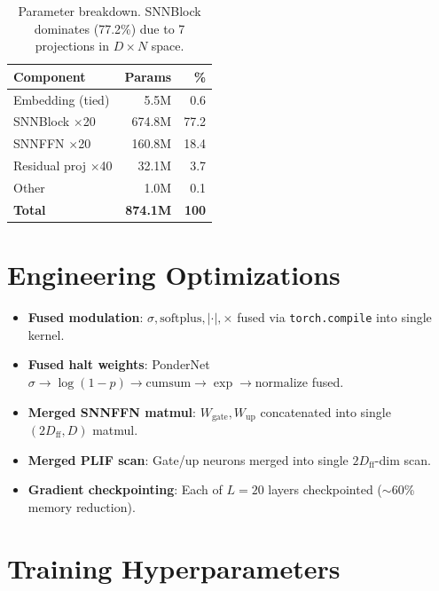 \documentclass{article}
\begin{document}
\begin{table}[H]
\centering
\small
\caption{Parameter breakdown. SNNBlock dominates (77.2\%) due to 7 projections in $D{\times}N$ space.}
\begin{tabular}{lrr}
\toprule
\textbf{Component} & \textbf{Params} & \textbf{\%} \\
\midrule
Embedding (tied) & 5.5M & 0.6 \\
SNNBlock $\times$20 & 674.8M & 77.2 \\
SNNFFN $\times$20 & 160.8M & 18.4 \\
Residual proj $\times$40 & 32.1M & 3.7 \\
Other & 1.0M & 0.1 \\
\midrule
\textbf{Total} & \textbf{874.1M} & \textbf{100} \\
\bottomrule
\end{tabular}
\end{table}

\section{Engineering Optimizations}
\label{app:engineering}

\begin{itemize}
    \item \textbf{Fused modulation}: $\sigma, \text{softplus}, |\cdot|, \times$ fused via \texttt{torch.compile} into single kernel.
    \item \textbf{Fused halt weights}: PonderNet $\sigma \to \log(1{-}p) \to \text{cumsum} \to \exp \to \text{normalize}$ fused.
    \item \textbf{Merged SNNFFN matmul}: $W_{\text{gate}}, W_{\text{up}}$ concatenated into single $(2D_{\text{ff}}, D)$ matmul.
    \item \textbf{Merged PLIF scan}: Gate/up neurons merged into single $2D_{\text{ff}}$-dim scan.
    \item \textbf{Gradient checkpointing}: Each of $L{=}20$ layers checkpointed ($\sim$60\% memory reduction).
\end{itemize}

\section{Training Hyperparameters}
\label{app:training}
\end{document}
